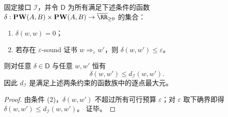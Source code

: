 \begin{proposition}\label{prop:dephys-budget-distance-universal-property}
固定接口 \(\mathcal I\)，并令 \(\mathsf D\) 为所有满足下述条件的函数 \(\delta:\mathbf{PW}(A,B)\times\mathbf{PW}(A,B)\to\overline{\RR}_{\ge 0}\) 的集合：
\begin{enumerate}
  \item \(\delta(w,w)=0\)；
  \item 若存在 \(\varepsilon\)-sound 证书 \(w\Longrightarrow_\varepsilon w'\)，则 \(\delta(w,w')\le \varepsilon\)。
\end{enumerate}
则对任意 \(\delta\in\mathsf D\) 与任意 \(w,w'\) 恒有
\[
\boxed{\;\delta(w,w')\le d_{\mathcal I}(w,w').\;}
\]
因此 \(d_{\mathcal I}\) 是满足上述两条约束的函数族中的逐点最大元。
\end{proposition}
\begin{proof}
由条件 (2)，\(\delta(w,w')\) 不超过所有可行预算 \(\varepsilon\)；对 \(\varepsilon\) 取下确界即得
\(
\delta(w,w')\le d_{\mathcal I}(w,w')
\)。
证毕。
\end{proof}

\endinput
